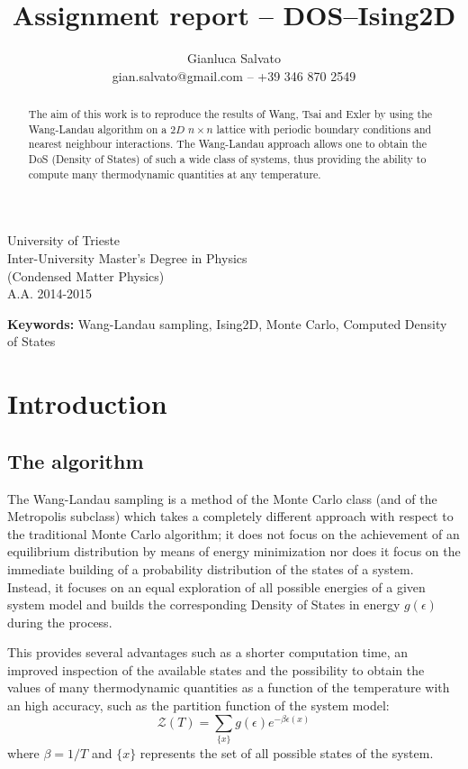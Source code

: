 \documentclass[11pt]{article}
\title{Assignment report -- DOS--Ising2D}
\author{Gianluca Salvato\\\small{gian.salvato@gmail.com -- +39 346 870 2549}}
\newenvironment{keywords}{\begin{adjustwidth}{5.2em}{5.2em}\footnotesize\textbf{Keywords:}}{\end{adjustwidth}}
\begin{document}
\VerbatimFootnotes
\DefineShortVerb{\|}

\maketitle
\begin{center}
	University of Trieste\\
	Inter-University Master’s Degree in Physics\\
	(Condensed Matter Physics)\\
	A.A. 2014-2015
\end{center}

\begin{abstract}
The aim of this work is to reproduce the results of Wang, Tsai and Exler \cite{bib:wang_landau} by using the Wang-Landau algorithm on a $2D$ $n\times n$ lattice with periodic boundary conditions and nearest neighbour interactions. The Wang-Landau approach allows one to obtain the DoS (Density of States) of such a wide class of systems, thus providing the ability to compute many thermodynamic quantities at any temperature.
\end{abstract}
\begin{keywords}
Wang-Landau sampling, Ising2D, Monte Carlo, Computed Density of States
\end{keywords}

\section*{Introduction}

\subsection*{The algorithm}

The Wang-Landau sampling is a method of the Monte Carlo class (and of the Metropolis subclass) which takes a completely different approach with respect to the traditional Monte Carlo algorithm; it does not focus on the achievement of an equilibrium distribution by means of energy minimization nor does it focus on the immediate building of a probability distribution of the states of a system.
Instead, it focuses on an equal exploration of all possible energies of a given system model and builds the corresponding Density of States in energy $g(\epsilon)$ during the process.

This provides several advantages such as a shorter computation time, an improved inspection of the available states and the possibility to obtain the values of many thermodynamic quantities as a function of the temperature with an high accuracy, such as the partition function of the system model:
\[
	\mathcal Z(T) = \sum_{\{x\}}g(\epsilon)e^{-\beta \epsilon(x)}
\]
where $\beta = 1/T$ and $\{x\}$ represents the set of all possible states of the system.
\end{document}
